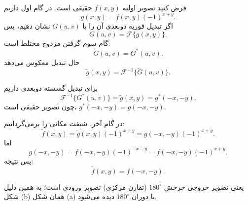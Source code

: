 فرض کنید تصویر اولیه $f(x,y)$ حقیقی است. در گام اول داریم
$$g(x,y)=f(x,y)(-1)^{x+y}.$$
اگر تبدیل فوریه دوبعدی آن را با $G(u,v)$ نشان دهیم، پس
$$G(u,v)=\mathcal{F}\{g(x,y)\}.$$
گام سوم گرفتن مزدوج مختلط است:
$$\tilde{G}(u,v)=G^{*}(u,v).$$
حال تبدیل معکوس می‌دهد
$$\tilde{g}(x,y)=\mathcal{F}^{-1}\{\tilde{G}(u,v)\}.$$

برای تبدیل گسسته دوبعدی داریم
$$\mathcal{F}^{-1}\{G^{*}(u,v)\}=\tilde{g}(x,y)=g^{*}(-x,-y).$$
چون تصویر حقیقی است، $g^{*}(-x,-y)=g(-x,-y)$.

در گام آخر، شیفت مکانی را برمی‌گردانیم:
$$\tilde{f}(x,y)=\tilde{g}(x,y)(-1)^{x+y}=g(-x,-y)(-1)^{x+y}.$$
اما
$$g(-x,-y)=f(-x,-y)(-1)^{-x-y}=f(-x,-y)(-1)^{x+y}.$$
پس نتیجه:
$$\tilde{f}(x,y)=f(-x,-y).$$

یعنی تصویر خروجی چرخش $180^\circ$ (تقارن مرکزی) تصویر ورودی است؛ به همین دلیل شکل (b) همان شکل (a) با دوران $180^\circ$ دیده می‌شود.